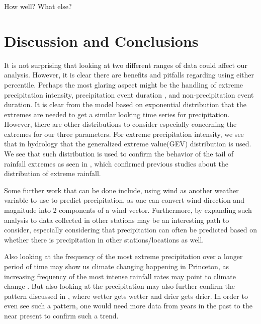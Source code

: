 \documentclass[11pt]{report}
\begin{document}
How well? What else?

\clearpage


\section{Discussion and Conclusions}\label{sec:conclusions}


It is not surprising that looking at two different ranges of data could affect our analysis. However, it is clear there are benefits and pitfalls regarding using either percentile. Perhaps the most glaring aspect might be the handling of extreme precipitation intensity, precipitation event duration
, and non-precipitation event duration. It is clear from the model based on exponential distribution that the extremes are needed to get a similar looking time series for precipitation. However, there are other distributions to consider especially concerning the extremes for our three parameters. For extreme precipitation intensity, we see that in hydrology that the generalized extreme value(GEV) distribution is used. We see that such distribution is used to confirm the behavior of the tail of rainfall extremes as seen in \cite[]{Hydro_dist}, which confirmed previous studies about the distribution of extreme rainfall.  



Some further work that can be done include, using wind as another weather variable to
use to predict precipitation, as one can convert wind direction and magnitude into 2
components of a wind vector. Furthermore, by expanding such analysis to data
collected in other stations may be an interesting path to consider, especially
considering that precipitation can often be predicted based on whether there is
precipitation in other stations/locations as well. 

Also looking at the frequency of the most extreme precipitation over a longer period of time may show us climate changing happening in Princeton, as  increasing frequency of the most intense rainfall rates may point to climate change . But also looking at the precipitation may also further confirm the pattern discussed in \cite{Held}, where wetter gets wetter and drier gets drier. In order to even see such a pattern, one would need more data from years in the past to the near present to confirm such a trend. 
\small
\renewcommand{\bibsep}{0em}

\renewcommand{\bibname}{References}


\end{document}
